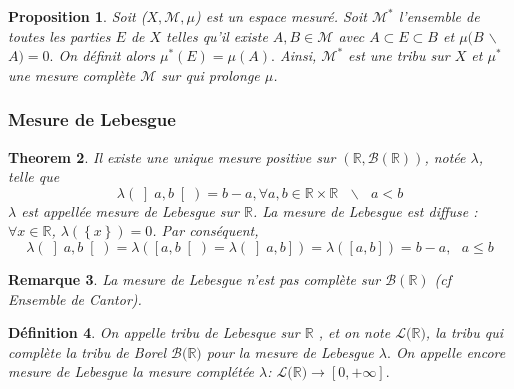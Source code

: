 \documentclass[3pt]{article}
\newtheorem{theorem}{Theorem}
\newtheorem{definition}[theorem]{D\'{e}finition}
\newtheorem{proposition}[theorem]{Proposition}
\newtheorem{remark}[theorem]{Remarque}
\begin{document}
\begin{proposition}
Soit ($X,\mathcal{M},\mu $) est un espace mesur\'{e}. Soit $\mathcal{M}%
^{\ast }$ l'ensemble de toutes les parties $E$ de $X$ telles qu'il existe $%
A,B\in \mathcal{M}$ avec $A\subset E\subset B$ et $\mu (B$ $\backslash $ $%
A)=0.$ On d\'{e}finit alors $\mu ^{\ast }(E)=\mu (A).$ Ainsi, $\mathcal{M}%
^{\ast }$ est une tribu sur $X$ et $\mu ^{\ast }$ une mesure compl\`{e}te $%
\mathcal{M}$ sur qui prolonge $\mu $.
\end{proposition}

\subsubsection{Mesure de Lebesgue}

\bigskip 

\begin{theorem}
Il existe une unique mesure positive sur $(\mathbb{R},\mathcal{B(\mathbb{R})}%
)$, not\'{e}e $\lambda $, telle que 
\begin{equation*}
\lambda (\left] a,b\right[ )=b-a,\forall a,b\in \mathbb{R}\times \mathbb{R}%
\text{ }\backslash \text{ }a<b
\end{equation*}%
$\lambda $ est appell\'{e}e mesure de Lebesgue sur $\mathbb{R}$. La mesure
de Lebesgue est diffuse : $\forall x\in \mathbb{R}$, $\lambda (\left\{
x\right\} )=0$. Par cons\'{e}quent,%
\begin{equation*}
\lambda (\left] a,b\right[ )=\lambda (\left[ a,b\right[ )=\lambda (\left] a,b%
\right] )=\lambda (\left[ a,b\right] )=b-a,\text{ }a\leq b
\end{equation*}
\end{theorem}

\bigskip 

\begin{remark}
La mesure de Lebesgue n'est pas compl\`{e}te sur $\mathcal{B(\mathbb{R})}$
(cf Ensemble de Cantor).
\end{remark}

\bigskip 

\begin{definition}
On appelle tribu de Lebesque sur $\mathbb{R}$ , et on note $\mathcal{L(}%
\mathbb{R}\mathcal{)}$, la tribu qui compl\`{e}te la tribu de Borel $%
\mathcal{B(}\mathbb{R}\mathcal{)}$ pour la mesure de Lebesgue $\lambda .$ On
appelle encore mesure de Lebesgue la mesure compl\'{e}t\'{e}e $\lambda $: $%
\mathcal{L(}\mathbb{R}\mathcal{)\rightarrow }\left[ 0,+\infty \right] .$
\end{definition}
\end{document}
